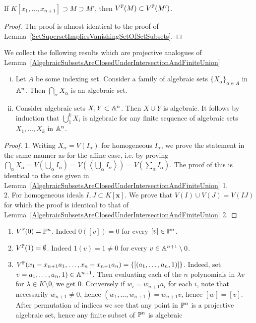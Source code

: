     \begin{lemma}
        If $K[x_1,\dots,x_{n+1}]\supset M\supset M'$, then $V^{\mathbb{P}}(M)\subset V^{\mathbb{P}}(M')$.
    \end{lemma}
    \begin{proof}
        The proof is almost identical to the proof of Lemma~\ref{SetSupersetImpliesVanishingSetOfSetSubsets}.    
    \end{proof}
    \begin{lemma}\label{ProjectiveAlgebraicSubsetsAreClosedUnderIntersectionAndFiniteUnion}
    We collect the following results which are projective analogues of Lemma~\ref{AlgebraicSubsetsAreClosedUnderIntersectionAndFiniteUnion}
    \begin{enumerate}[(i)]
        \item Let $A$ be some indexing set. Consider a family of algebraic sets $\{X_\alpha\}_{\alpha\in A}$ in $\mathbb{A}^n$. Then $\bigcap_{\alpha} X_\alpha$ is an algebraic set.
        \item Consider algebraic sets $X,Y\subset \mathbb{A}^n$. Then $X\cup Y$ is algebraic. It follows by induction that $\bigcup_1^k X_i$ is algebraic for any finite sequence of algebraic sets $X_1,\dots,X_k$ in $\mathbb{A}^n$.  
    \end{enumerate}
\end{lemma}
\begin{proof}
    1. Writing $X_\alpha = V(I_\alpha)$ for homogeneous $I_\alpha$, we prove the statement in the same manner as for the affine case, i.e. by proving $\bigcap_\alpha X_\alpha =  V\left(\bigcup_\alpha I_\alpha\right)= V\left(\left\langle \bigcup_\alpha I_\alpha\right\rangle\right) = V\left(\sum_\alpha I_\alpha \right)$. The proof of this is identical to the one given in Lemma~\ref{AlgebraicSubsetsAreClosedUnderIntersectionAndFiniteUnion} 1.\\
    2. For homogeneous ideals $I,J\subset K[\mathbf{x}]$. We prove that $V(I)\cup V(J)=V(IJ)$ for which the proof is identical to that of Lemma~\ref{AlgebraicSubsetsAreClosedUnderIntersectionAndFiniteUnion} 2.
\end{proof}
\begin{example}
    \begin{enumerate}
        \item $V^{\mathbb{P}}(0)= \mathbb{P}^n$. Indeed $0([v])=0$ for every $[v]\in\mathbb{P}^n$.
        \item $V^{\mathbb{P}}(1)= \emptyset$. Indeed $1(v)=1\neq 0$ for every $v\in \mathbb{A}^{n+1}\setminus 0$.
        \item $V^{\mathbb{P}}(x_1-x_{n+1}a_1,\dots,x_n-x_{n+1}a_n) = \{[(a_1,\dots,a_n,1)]\}$. Indeed, set $v=a_1,\dots,a_n,1)\in \mathbb{A}^{n+1}$. Then evaluating each of the $n$ polynomials in $\lambda v$ for $\lambda\in K\setminus 0$, we get $0$. Conversely if $w_i=w_{n+1}a_i$ for each $i$, note that necessarily $w_{n+1}\neq 0$, hence $(w_1,\dots,w_{n+1})=w_{n+1}v$, hence $[w]=[v]$. After permutation of indices we see that any point in $\mathbb{P}^n$ is a projective algebraic set, hence any finite subset of $\mathbb{P}^n$ is algebraic
    \end{enumerate}
\end{example}
